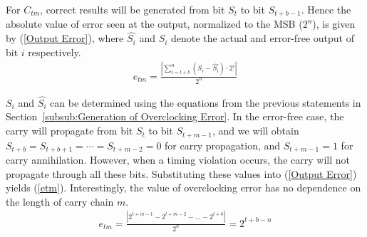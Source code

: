 \documentclass[journal]{IEEEtran}
\begin{document}
For $C_{tm}$, correct results will be generated from bit $S_t$ to bit $S_{t+b-1}$. Hence the absolute value of error seen at the output, normalized to the MSB ($2^n$), is given by (\ref{Output Error}), where $\hat{S_i}$ and $S_i$ denote the actual and error-free output of bit $i$ respectively.
%
\begin{eqnarray}\label{Output Error}
    e_{tm}=\frac{\left|\sum_{i=t+b}^{n}(S_i-\hat{S_i})\cdot 2^i\right|}{2^n}
\end{eqnarray}

$S_i$ and $\hat{S_i}$ can be determined using the equations from the previous statements in Section~\ref{subsub:Generation of Overclocking Error}. In the error-free case, the carry will propagate from bit $S_t$ to bit $S_{t+m-1}$, and we will obtain $S_{t+b}=S_{t+b+1}=\cdots=S_{t+m-2}=0$ for carry propagation, and $S_{t+m-1}=1$ for carry annihilation. However, when a timing violation occurs, the carry will not propagate through all these bits. Substituting these values into (\ref{Output Error}) yields (\ref{etm}). Interestingly, the value of overclocking error has no dependence on the length of carry chain $m$.
%
%
\begin{eqnarray}\label{etm}
  e_{tm}=\frac{\left|2^{t+m-1}-2^{t+m-2}-\dots-2^{t+b}\right|}{2^n}=2^{t+b-n}
\end{eqnarray}
\end{document}
